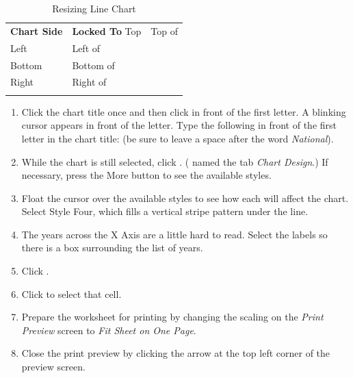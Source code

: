 \begin{table}[H]
{\small
	\begin{longtable}{R{0.75in}L{1.50in}} %
		\textbf{Chart Side} & \textbf{Locked To} \endhead
		\hline
		Top & Top of \\
		Left & Left of \\
		Bottom & Bottom of \\
		Right & Right of \\
		\caption{Resizing Line Chart}
		\label{04:tab07}
	\end{longtable}
} %
\end{table}

\begin{enumerate}[resume]
	\item Click the chart title once and then click in front of the first letter. A blinking cursor appears in front of the letter. Type the following in front of the first letter in the chart title:  (be sure to leave a space after the word \textit{National}).
	\item While the chart is still selected, click . ( named the tab \textit{Chart Design}.) If necessary, press the More button to see the available styles.
	\item Float the cursor over the available styles to see how each will affect the chart. Select Style Four, which fills a vertical stripe pattern under the line.
	\item The years across the X Axis are a little hard to read. Select the labels so there is a box surrounding the list of years. 
	\item Click .
	\item Click  to select that cell.
	\item Prepare the  worksheet for printing by changing the scaling on the \textit{Print Preview} screen to \textit{Fit Sheet on One Page}.
	\item Close the print preview by clicking the arrow at the top left corner of the preview screen.
\end{enumerate}


